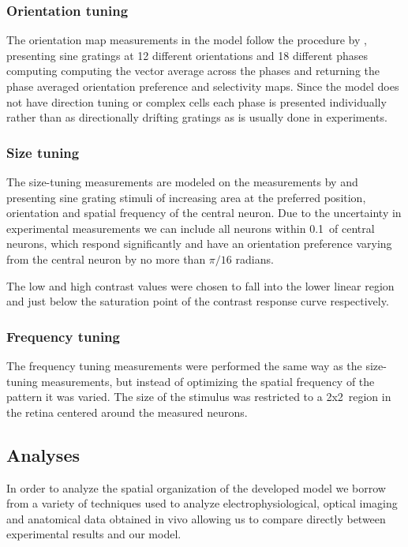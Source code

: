 \subsubsection{Orientation tuning} \label{ORMeasurement}

The orientation map measurements in the model follow the procedure by
\cite{Blasdel1992}, presenting sine gratings at 12 different
orientations and 18 different phases computing computing the vector
average across the phases and returning the phase averaged orientation
preference and selectivity maps. Since the model does not have
direction tuning or complex cells each phase is presented individually
rather than as directionally drifting gratings as is usually done in
experiments.

\subsubsection{Size tuning}

The size-tuning measurements are modeled on the measurements by
\cite{Sceniak1999} and \cite{Sceniak2001} presenting sine grating
stimuli of increasing area at the preferred position, orientation and
spatial frequency of the central neuron. Due to the uncertainty in
experimental measurements we can include all neurons within
0.1\degree\ of central neurons, which respond significantly and have
an orientation preference varying from the central neuron by no more
than $\pi/16$ radians.

The low and high contrast values were chosen to fall into the lower
linear region and just below the saturation point of the contrast
response curve respectively.

\subsubsection{Frequency tuning}

The frequency tuning measurements were performed the same way as the
size-tuning measurements, but instead of optimizing the spatial
frequency of the pattern it was varied. The size of the stimulus was
restricted to a 2x2\degree\ region in the retina centered around the
measured neurons.

\subsection{Analyses}

In order to analyze the spatial organization of the developed model we
borrow from a variety of techniques used to analyze
electrophysiological, optical imaging and anatomical data obtained in
vivo allowing us to compare directly between experimental results and
our model.

